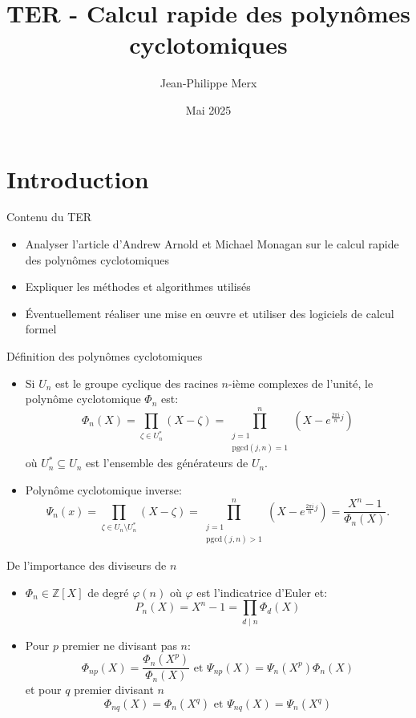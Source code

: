 \documentclass{beamer}
\title{TER - Calcul rapide des polynômes cyclotomiques}
\author{Jean-Philippe Merx}
\institute{M1 Mathématiques - Sorbonne Université}
\date{Mai 2025}
\newcommand{\pgcd}{\mathrm{pgcd}}
\begin{document}
	
	\frame{\titlepage}
	
	
	\newtheorem{theoreme}{Théorème}
	\newtheorem{proposition}{Proposition}
	
	\section{Introduction}
	
	\begin{frame}{Contenu du TER}
		\begin{itemize}
			\item Analyser l'article d'Andrew Arnold et Michael Monagan sur le calcul rapide des polynômes cyclotomiques
			\item Expliquer les méthodes et algorithmes utilisés
			\item Éventuellement réaliser une mise en œuvre et utiliser des logiciels de calcul formel
		\end{itemize}
	\end{frame}
	
	\begin{frame}{Définition des polynômes cyclotomiques}
		\begin{itemize}
			\item Si $U_n$ est le groupe cyclique des racines $n$-ième complexes de l'unité, le polynôme cyclotomique $\Phi_n$ est:
			$$\Phi_n(X) = \prod_{\zeta \in U^*_n} (X - \zeta) = \prod_{\substack{j=1\\ \pgcd(j,n)=1}}^n (X - e^{\frac{2 \pi i}{n}j})$$ où $U_n^* \subseteq U_n$ est l'ensemble des générateurs de $U_n$.
			\item Polynôme cyclotomique inverse:
			$$\Psi_n(x) = \prod_{\zeta \in U_n \setminus U^*_n} (X - \zeta) = \prod_{\substack{j=1\\ \pgcd(j,n) > 1}}^n (X - e^{\frac{2 \pi i}{n}j}) = \frac{X^n - 1}{\Phi_n(X)}.$$
		\end{itemize}
	\end{frame}
	
	\begin{frame}{De l'importance des diviseurs de $n$}
		\begin{itemize}
			\item $\Phi_n \in \mathbb Z[X]$ de degré $\varphi(n)$ où $\varphi$ est l'indicatrice d'Euler et:
			$$P_n(X) = X^n-1 = \prod_{ d \mid n} \Phi_d(X)$$
			\item Pour $p$ premier ne divisant pas $n$:
			$$\Phi_{np}(X) = \frac{\Phi_n(X^p)}{\Phi_n(X)} \text{ et } \Psi_{np}(X) = \Psi_n(X^p)\Phi_n(X)$$
			et pour $q$ premier divisant $n$
			$$\Phi_{nq}(X) = \Phi_n(X^q) \text{ et } \Psi_{nq}(X) = \Psi_n(X^q)$$
		\end{itemize}
	\end{frame}
\end{document}
